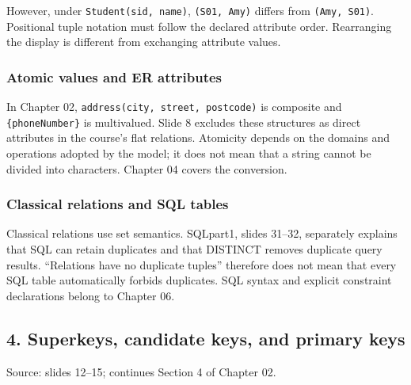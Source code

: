 However, under \texttt{Student(\allowbreak{}sid,\allowbreak{}\ name)\allowbreak{}}, \texttt{(\allowbreak{}S01,\allowbreak{}\ Amy)\allowbreak{}} differs from \texttt{(\allowbreak{}Amy,\allowbreak{}\ S01)\allowbreak{}}. Positional tuple notation must follow the declared attribute order. Rearranging the display is different from exchanging attribute values.

\subsubsection{Atomic values and ER attributes}\label{03_relational_model_and_integrity_en-atomic-values-and-er-attributes}

In Chapter 02, \texttt{address(\allowbreak{}city,\allowbreak{}\ street,\allowbreak{}\ postcode)\allowbreak{}} is composite and \texttt{\{phoneNumber\}} is multivalued. Slide 8 excludes these structures as direct attributes in the course's flat relations. Atomicity depends on the domains and operations adopted by the model; it does not mean that a string cannot be divided into characters. Chapter 04 covers the conversion.

\subsubsection{Classical relations and SQL tables}\label{03_relational_model_and_integrity_en-classical-relations-and-sql-tables}

Classical relations use set semantics. SQLpart1, slides 31--32, separately explains that SQL can retain duplicates and that DISTINCT removes duplicate query results. ``Relations have no duplicate tuples'' therefore does not mean that every SQL table automatically forbids duplicates. SQL syntax and explicit constraint declarations belong to Chapter 06.

\subsection{4. Superkeys, candidate keys, and primary keys}\label{03_relational_model_and_integrity_en-superkeys-candidate-keys-and-primary-keys}

Source: slides 12--15; continues Section 4 of Chapter 02.

